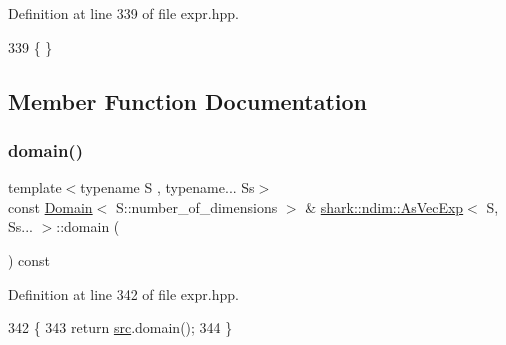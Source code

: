 Definition at line 339 of file expr.\+hpp.


\begin{DoxyCode}
339 \{ \}
\end{DoxyCode}


\subsection{Member Function Documentation}
\hypertarget{classshark_1_1ndim_1_1_as_vec_exp_3_01_s_00_01_ss_8_8_8_01_4_a966cfc78765aacd255d04561c5113955}{}\label{classshark_1_1ndim_1_1_as_vec_exp_3_01_s_00_01_ss_8_8_8_01_4_a966cfc78765aacd255d04561c5113955} 
\subsubsection{\texorpdfstring{domain()}{domain()}}
{\footnotesize\ttfamily template$<$typename S , typename... Ss$>$ \\
const \hyperlink{classshark_1_1ndim_1_1_domain}{Domain}$<$ S\+::number\+\_\+of\+\_\+dimensions $>$ \& \hyperlink{classshark_1_1ndim_1_1_as_vec_exp}{shark\+::ndim\+::\+As\+Vec\+Exp}$<$ S, Ss... $>$\+::domain (\begin{DoxyParamCaption}{ }\end{DoxyParamCaption}) const\hspace{0.3cm}{\ttfamily [inline]}}



Definition at line 342 of file expr.\+hpp.


\begin{DoxyCode}
342                                                                                     \{
343             \textcolor{keywordflow}{return} \hyperlink{classshark_1_1ndim_1_1_as_vec_exp_3_01_s_00_01_ss_8_8_8_01_4_a194abf424b594c3e86a42aa114700e51}{src}.domain();
344         \}
\end{DoxyCode}
\hypertarget{classshark_1_1ndim_1_1_as_vec_exp_3_01_s_00_01_ss_8_8_8_01_4_a885d0c0a2d813c3aa2685dc68be585a2}{}\label{classshark_1_1ndim_1_1_as_vec_exp_3_01_s_00_01_ss_8_8_8_01_4_a885d0c0a2d813c3aa2685dc68be585a2} 
